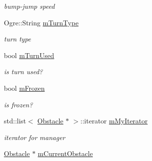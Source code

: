 \begin{DoxyCompactItemize}
\begin{DoxyCompactList}\small\item\em bump-\/jump speed \end{DoxyCompactList}\item 
Ogre\+::\+String \hyperlink{class_n_c_t_u_1_1_obstacle_a2bf103c410891ac74c39ef8900f936d6}{m\+Turn\+Type}\hypertarget{class_n_c_t_u_1_1_obstacle_a2bf103c410891ac74c39ef8900f936d6}{}\label{class_n_c_t_u_1_1_obstacle_a2bf103c410891ac74c39ef8900f936d6}

\begin{DoxyCompactList}\small\item\em turn type \end{DoxyCompactList}\item 
bool \hyperlink{class_n_c_t_u_1_1_obstacle_a00ba3567bc37de10576bcb0e4aa0180b}{m\+Turn\+Used}\hypertarget{class_n_c_t_u_1_1_obstacle_a00ba3567bc37de10576bcb0e4aa0180b}{}\label{class_n_c_t_u_1_1_obstacle_a00ba3567bc37de10576bcb0e4aa0180b}

\begin{DoxyCompactList}\small\item\em is turn used? \end{DoxyCompactList}\item 
bool \hyperlink{class_n_c_t_u_1_1_obstacle_a42c01e3c5cf2ac4b96fb78565022e2a9}{m\+Frozen}\hypertarget{class_n_c_t_u_1_1_obstacle_a42c01e3c5cf2ac4b96fb78565022e2a9}{}\label{class_n_c_t_u_1_1_obstacle_a42c01e3c5cf2ac4b96fb78565022e2a9}

\begin{DoxyCompactList}\small\item\em is frozen? \end{DoxyCompactList}\item 
std\+::list$<$ \hyperlink{class_n_c_t_u_1_1_obstacle}{Obstacle} $\ast$ $>$\+::iterator \hyperlink{class_n_c_t_u_1_1_obstacle_a66f871667db677d933413d2a986cc0cc}{m\+My\+Iterator}\hypertarget{class_n_c_t_u_1_1_obstacle_a66f871667db677d933413d2a986cc0cc}{}\label{class_n_c_t_u_1_1_obstacle_a66f871667db677d933413d2a986cc0cc}

\begin{DoxyCompactList}\small\item\em iterator for manager \end{DoxyCompactList}\item 
\hyperlink{class_n_c_t_u_1_1_obstacle}{Obstacle} $\ast$ \hyperlink{class_n_c_t_u_1_1_obstacle_ab0ef4a664fa4320d99e3256f1f50e434}{m\+Current\+Obstacle}\hypertarget{class_n_c_t_u_1_1_obstacle_ab0ef4a664fa4320d99e3256f1f50e434}{}\label{class_n_c_t_u_1_1_obstacle_ab0ef4a664fa4320d99e3256f1f50e434}


\end{DoxyCompactItemize}
